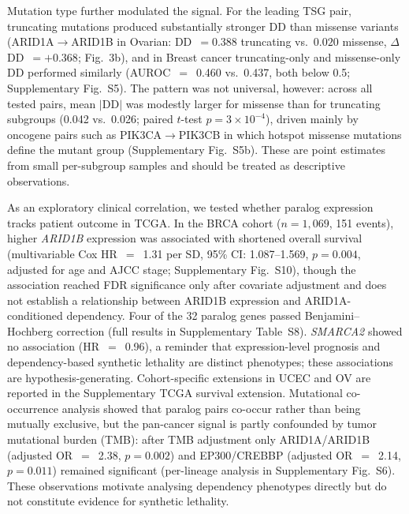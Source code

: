 \documentclass[11pt,a4paper]{article}
\begin{document}
Mutation type further modulated the signal. For the leading TSG pair, truncating mutations produced substantially stronger DD than missense variants (ARID1A$\rightarrow$ARID1B in Ovarian: DD~$=0.388$ truncating vs.\ $0.020$ missense, $\Delta$DD~$=+0.368$; Fig.~3b), and in Breast cancer truncating-only and missense-only DD performed similarly (AUROC~$=$~0.460 vs.\ 0.437, both below 0.5; Supplementary Fig.~S5). The pattern was not universal, however: across all tested pairs, mean $|$DD$|$ was modestly larger for missense than for truncating subgroups (0.042 vs.\ 0.026; paired $t$-test $p=3\times10^{-4}$), driven mainly by oncogene pairs such as PIK3CA$\rightarrow$PIK3CB in which hotspot missense mutations define the mutant group (Supplementary Fig.~S5b). These are point estimates from small per-subgroup samples and should be treated as descriptive observations.

As an exploratory clinical correlation, we tested whether paralog expression tracks patient outcome in TCGA. In the BRCA cohort ($n=1{,}069$, 151 events), higher \textit{ARID1B} expression was associated with shortened overall survival (multivariable Cox HR~$=$~1.31 per SD, 95\% CI: 1.087--1.569, $p=0.004$, adjusted for age and AJCC stage; Supplementary Fig.~S10), though the association reached FDR significance only after covariate adjustment and does not establish a relationship between ARID1B expression and ARID1A-conditioned dependency. Four of the 32 paralog genes passed Benjamini--Hochberg correction (full results in Supplementary Table~S8). \textit{SMARCA2} showed no association (HR~$=$~0.96), a reminder that expression-level prognosis and dependency-based synthetic lethality are distinct phenotypes; these associations are hypothesis-generating. Cohort-specific extensions in UCEC and OV are reported in the Supplementary TCGA survival extension. Mutational co-occurrence analysis showed that paralog pairs co-occur rather than being mutually exclusive, but the pan-cancer signal is partly confounded by tumor mutational burden (TMB): after TMB adjustment only ARID1A/ARID1B (adjusted OR~$=$~2.38, $p=0.002$) and EP300/CREBBP (adjusted OR~$=$~2.14, $p=0.011$) remained significant (per-lineage analysis in Supplementary Fig.~S6). These observations motivate analysing dependency phenotypes directly but do not constitute evidence for synthetic lethality.
\end{document}
